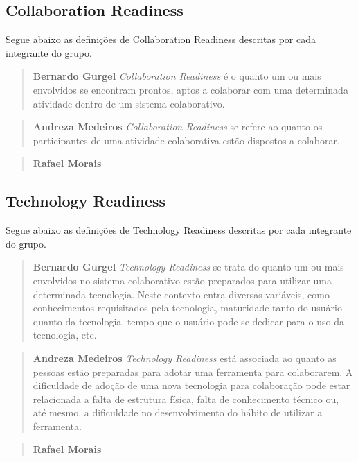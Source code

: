 \documentclass{acm_proc_article-sp}
\begin{document}
\subsection{Collaboration Readiness}
Segue abaixo as definições de Collaboration Readiness descritas por cada integrante do grupo.

\begin{quote}\textbf{Bernardo Gurgel}
\textsl{Collaboration Readiness} é o quanto um ou mais envolvidos se encontram prontos, aptos a colaborar com uma determinada atividade dentro de um sistema colaborativo.
\end{quote}

\begin{quote}\textbf{Andreza Medeiros}
  \textsl{Collaboration Readiness} se refere ao quanto os participantes de uma atividade colaborativa estão dispostos a colaborar.
\end{quote}

\begin{quote}\textbf{Rafael Morais}
\end{quote}

\subsection{Technology Readiness}
Segue abaixo as definições de Technology Readiness descritas por cada integrante do grupo.

\begin{quote}\textbf{Bernardo Gurgel}
\textsl{Technology Readiness} se trata do quanto um ou mais envolvidos no sistema colaborativo estão preparados para utilizar uma determinada tecnologia. Neste contexto entra diversas variáveis, como conhecimentos requisitados pela tecnologia, maturidade tanto do usuário quanto da tecnologia, tempo que o usuário pode se dedicar para o uso da tecnologia, etc.
\end{quote}

\begin{quote}\textbf{Andreza Medeiros}
\textsl{Technology Readiness} está associada ao quanto as pessoas estão preparadas para adotar uma ferramenta para colaborarem. A dificuldade de adoção de uma nova tecnologia para colaboração pode estar relacionada a falta de estrutura física, falta de conhecimento técnico ou, até mesmo, a dificuldade no desenvolvimento do hábito de utilizar a ferramenta.
\end{quote}

\begin{quote}\textbf{Rafael Morais}
\end{quote}
\end{document}

